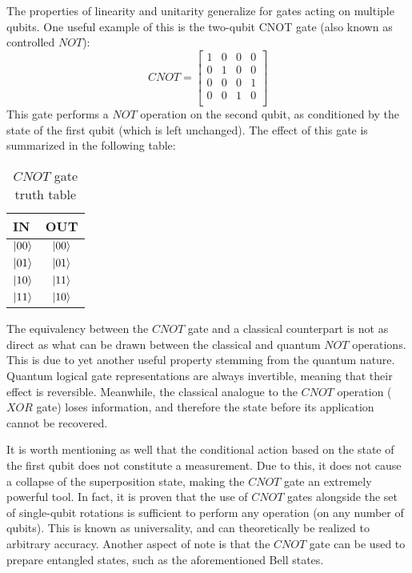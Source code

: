 The properties of linearity and unitarity generalize for gates acting on multiple qubits. One useful example of this is the two-qubit CNOT gate (also known as controlled $NOT$):
\begin{equation}
    CNOT=\begin{bmatrix}
        1&0&0&0\\
        0&1&0&0\\		 		
        0&0&0&1\\
        0&0&1&0\\
    \end{bmatrix}
\end{equation}
This gate performs a $NOT$ operation on the second qubit, as conditioned by the state of the first qubit (which is left unchanged). The effect of this gate is summarized in the following table:
\begin{table}[hbt!]
    \centering
    \begin{tabular}{l | c }
        IN & OUT\\
        \hline \hline
        $\ket{00}$ & $\ket{00}$ \\ 
        $\ket{01}$ & $\ket{01}$\\
        $\ket{10}$ & $\ket{11}$\\
        $\ket{11}$ & $\ket{10}$
    \end{tabular}
\caption{$CNOT$ gate truth table}
\end{table}
\FloatBarrier

The equivalency between the $CNOT$ gate and a classical counterpart is not as direct as what can be drawn between the classical and quantum $NOT$ operations. This is due to yet another useful property stemming from the quantum nature. Quantum logical gate representations are always invertible, meaning that their effect is reversible. Meanwhile, the classical analogue to the $CNOT$ operation ($XOR$ gate) loses information, and therefore the state before its application cannot be recovered.

 It is worth mentioning as well that the conditional action based on the state of the first qubit does not constitute a measurement. Due to this, it does not cause a collapse of the superposition state, making the $CNOT$ gate an extremely powerful tool. In fact, it is proven that the use of $CNOT$ gates alongside the set of single-qubit rotations is sufficient to perform any operation (on any number of qubits). This is known as universality, and can theoretically be realized to arbitrary accuracy.
 Another aspect of note is that the $CNOT$ gate can be used to prepare entangled states, such as the aforementioned Bell states.

